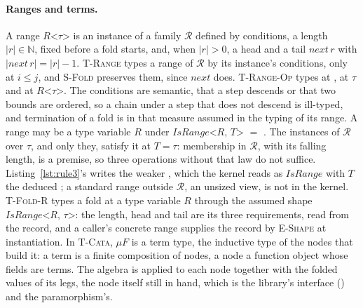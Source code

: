 \paragraph{Ranges and terms.}
A range $R\texttt{<}\tau\texttt{>}$ is an instance of a family $\mathcal{R}$ defined by conditions, a length $|r| \in \mathbb{N}$, fixed before a fold starts, and, when $|r| > 0$, a head and a tail $\mathit{next}\,r$ with $|\mathit{next}\,r| = |r| - 1$.
\textsc{T-Range} types a range of $\mathcal{R}$ by its instance's conditions,  only at $i \le j$, and \textsc{S-Fold} preserves them, since $\mathit{next}$ does.
\textsc{T-Range-Op} types  at ,  at $\tau$ and  at $R\texttt{<}\tau\texttt{>}$.
The conditions are semantic, that a step descends or that two bounds are ordered, so a chain under a step that does not descend is ill-typed, and termination of a fold is in that measure assumed in the typing of its range.
A range may be a type variable $R$ under $\mathit{IsRange}\texttt{<}R\texttt{, }T\texttt{>}$ $=$ .
The instances of $\mathcal{R}$ over $\tau$, and only they, satisfy it at $T = \tau$: membership in $\mathcal{R}$, with its falling length, is a premise, so three operations without that law do not suffice.
Listing~\ref{lst:rule3}'s  writes the weaker , which the kernel reads as $\mathit{IsRange}$ with $T$ the deduced ; a standard range outside $\mathcal{R}$, an unsized view, is not in the kernel.
\textsc{T-Fold-R} types a fold at a type variable $R$ through the assumed shape $\mathit{IsRange}\texttt{<}R\texttt{, }\tau\texttt{>}$: the length, head and tail are its three requirements, read from the record, and a caller's concrete range supplies the record by \textsc{E-Shape} at instantiation.
In \textsc{T-Cata}, $\mu F$ is a term type, the inductive type of the nodes that build it: a term is a finite composition of nodes, a node a function object whose fields are terms.
The algebra is applied to each node together with the folded values of its legs, the node itself still in hand, which is the library's interface () and the paramorphism's.


